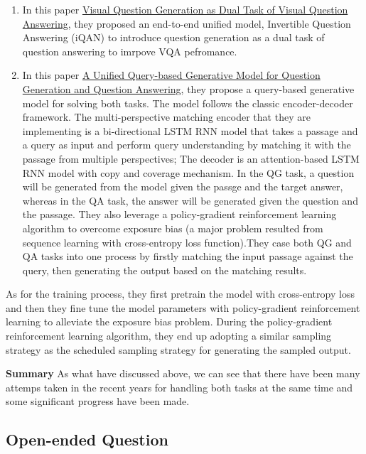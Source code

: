 \documentclass[]{book}
\theoremstyle{definition}
\theoremstyle{definition}
\theoremstyle{definition}
\theoremstyle{remark}
\begin{document}
\begin{enumerate}
\def\labelenumi{\arabic{enumi}.}
\setcounter{enumi}{2}
\item
  In this paper
  \href{http://cvboy.com/pdf/publications/cvpr2018_iqan.pdf}{Visual
  Question Generation as Dual Task of Visual Question Answering}, they
  proposed an end-to-end unified model, Invertible Question Answering
  (iQAN) to introduce question generation as a dual task of question
  answering to imrpove VQA pefromance.
\item
  In this paper \href{https://arxiv.org/pdf/1709.01058.pdf}{A Unified
  Query-based Generative Model for Question Generation and Question
  Answering}, they propose a query-based generative model for solving
  both tasks. The model follows the classic encoder-decoder framework.
  The multi-perspective matching encoder that they are implementing is a
  bi-directional LSTM RNN model that takes a passage and a query as
  input and perform query understanding by matching it with the passage
  from multiple perspectives; The decoder is an attention-based LSTM RNN
  model with copy and coverage mechanism. In the QG task, a question
  will be generated from the model given the passge and the target
  answer, whereas in the QA task, the answer will be generated given the
  question and the passage. They also leverage a policy-gradient
  reinforcement learning algorithm to overcome exposure bias (a major
  problem resulted from sequence learning with cross-entropy loss
  function).They case both QG and QA tasks into one process by firstly
  matching the input passage against the query, then generating the
  output based on the matching results.
\end{enumerate}

As for the training process, they first pretrain the model with
cross-entropy loss and then they fine tune the model parameters with
policy-gradient reinforcement learning to alleviate the exposure bias
problem. During the policy-gradient reinforcement learning algorithm,
they end up adopting a similar sampling strategy as the scheduled
sampling strategy for generating the sampled output.

\textbf{Summary} As what have discussed above, we can see that there
have been many attemps taken in the recent years for handling both tasks
at the same time and some significant progress have been made.

\subsection{Open-ended Question}\label{open-ended-question}
\end{document}
